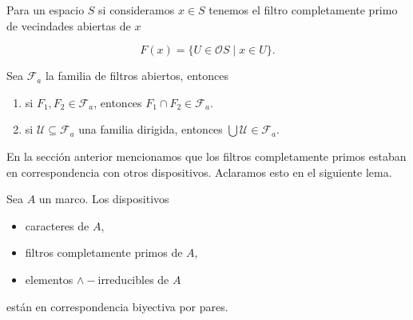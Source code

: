 Para un espacio $S$ si consideramos $x\in S$ tenemos el filtro completamente primo de vecindades abiertas de $x$

\[
F(x)=\{U\in \mathcal{O}S\mid x\in U\}.
\]


\begin{prop}\label{CaracterizacionFabiertos} 
Sea $\mathcal{F}_a$ la familia de filtros abiertos, entonces 
    \begin{enumerate}
        \item si $F_1, F_2\in \mathcal{F}_a$, entonces $F_1\cap F_2 \in \mathcal{F}_a$.
        \item si $\mathcal{U}\subseteq \mathcal{F}_a$ una familia dirigida, entonces $\bigcup \mathcal{U}\in \mathcal{F}_a$.
    \end{enumerate}
\end{prop}

En la sección anterior mencionamos que los filtros completamente primos estaban en correspondencia con otros dispositivos. Aclaramos esto en el siguiente lema.

\begin{lem}
    Sea $A$ un marco. Los dispositivos 
    \begin{itemize}
        \item caracteres de $A$,
        \item filtros completamente primos de $A$,
        \item elementos $\wedge-$irreducibles de $A$
    \end{itemize}
    están en correspondencia biyectiva por pares.
\end{lem}